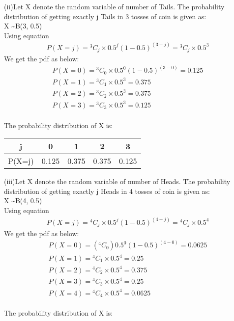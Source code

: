 \documentclass[journal,12pt,twocolumn]{IEEEtran}
\newcommand*{\Comb}[2]{{}^{#1}C_{#2}}%
\begin{document}
(ii)Let X denote the random variable of number of Tails.
The probability distribution of getting exactly j Tails in 3 tosses of coin is given as:
\\X \textasciitilde B(3, 0.5) 
\\Using equation 
\begin{align}
    P(X = j) = \Comb{3}{j}\times { 0.5^j (1-0.5)^{(3-j)}} =\Comb{3}{j}\times { 0.5^3}
\end{align}
We get the pdf as below:
\begin{align}
    P(X=0) = \Comb{3}{0}\times { 0.5^0 (1-0.5)^{(3-0)}}
    =0.125
    \\P(X=1) = \Comb{3}{1}\times { 0.5^3} = 0.375
    \\P(X=2) = \Comb{3}{2}\times { 0.5^3} = 0.375
    \\P(X=3) = \Comb{3}{3}\times { 0.5^3} = 0.125
\end{align}
\\The probability distribution of X is: 

\begin{center}
\begin{tabular}{ |c|c|c|c|c| } 
 \hline
 j & 0 & 1 & 2 & 3 \\ \hline
 P(X=j) & 0.125& 0.375 & 0.375 & 0.125 \\ 
 \hline
\end{tabular}
\end{center}
(iii)Let X denote the random variable of number of Heads.
The probability distribution of getting exactly j Heads in 4 tosses of coin is given as:
\\X \textasciitilde B(4, 0.5) 
\\Using equation 
\begin{align}
    P(X = j) = \Comb{4}{j}\times { 0.5^j (1-0.5)^{(4-j)}} =\Comb{4}{j}\times { 0.5^4}
\end{align}
We get the pdf as below:
\begin{align}
    P(X=0) =(\Comb{4}{0}){ 0.5^0 (1-0.5)^{(4-0)}}
    =0.0625
    \\P(X=1) = \Comb{4}{1}\times { 0.5^4} = 0.25
    \\P(X=2) = \Comb{4}{2}\times { 0.5^4} = 0.375
    \\P(X=3) = \Comb{4}{3}\times { 0.5^4} = 0.25
    \\P(X=4) = \Comb{4}{4}\times { 0.5^4} = 0.0625
\end{align}
\\The probability distribution of X is: 
\end{document}
